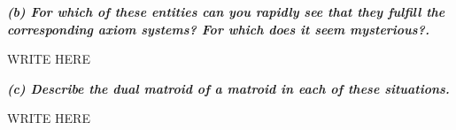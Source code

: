 \hspace{5pt}\textbf{\textit{(b) For which of these entities can you rapidly see that they fulfill the corresponding axiom systems?  For which does it seem mysterious?.}}

\vspace{3pt}

WRITE HERE

\vspace{3pt}

\hspace{5pt}\textbf{\textit{(c) Describe the dual matroid of a matroid in each of these situations.}}

\vspace{3pt}

WRITE HERE
